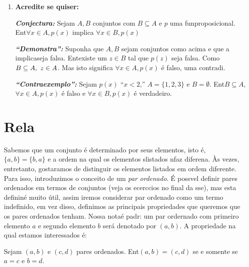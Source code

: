 \begin{enumerate}[{\bf 1.}]
\item {\bf Acredite se quiser:}  

\noindent \textit{\textbf{Conjectura:}} Sejam $A,B$ conjuntos com $B\subseteq A$ e $p$ uma fun\cao proposicional. Ent\ao $\forall x\in A, p(x)$ implica $\forall x\in B, p(x)$  

\noindent \textit{\textbf{``Demonstra\caoi'':}} Suponha que $A,B$ sejam conjuntos como acima e que a implica\cao seja falsa. Ent\ao existe um $z\in B$ tal que $p(z)$ seja falsa. Como $B\subseteq A, \textrm{ } z\in A$. Mas isto significa $\forall x \in A, p(x)$ \'e falso, uma contradi\caoi. 

\noindent \textit{\textbf{``Contraexemplo'':}} Sejam $p(x)$ ``$x<2$,'' $A=\{1,2,3\}$ e $B=\emptyset$. Ent\ao $B\subseteq A$, $\forall x \in A, p(x)$ \'e falso e $\forall x \in B, p(x)$ \'e verdadeiro.
\end{enumerate}

\section{Rela\cois}\label{relacoes}


Sabemos que um conjunto \'e determinado por seus elementos, isto \'e, $\{a,b\}=\{b,a\}$ e a ordem na qual os elementos s\ao listados n\ao faz diferen\cc a. \`As vezes, entretanto, gostar\ih amos de distinguir os elementos listados em ordem diferente. Para isso, introduzimos o conceito de um {\it par ordenado}. \'E poss\ih vel definir pares ordenados em termos de conjuntos (veja os ecerc\ih cios no final da sse\caoi), mas esta defini\cao n\ao \'e muito \'util, assim iremos considerar par ordenado como um termo indefinido, em vez disso, definimos as principais propriedades que queremos que os pares ordenados tenham. Nossa nota\cao \'e padr\aoi: um par ordernado com primeiro elemento $a$ e segundo elemento $b$ ser\'a denotado por $(a,b)$. A propriedade na qual estamos interessados \'e:
\begin{definb}
Sejam $(a,b)$ e $(c,d)$ pares ordenados. Ent\ao $(a,b)=(c,d)$ se e somente se $a=c$ e $b=d$.
\end{definb}

